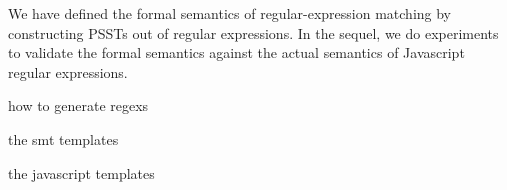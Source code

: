 
We have defined the formal semantics of regular-expression matching by constructing PSSTs out of regular expressions. 
In the sequel, we do experiments to validate the formal semantics against the actual semantics of Javascript regular expressions.

how to generate regexs

the smt templates

the javascript templates

